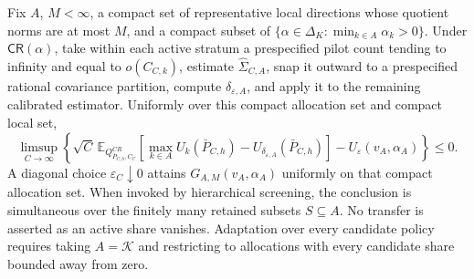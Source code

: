 Fix \(A\), \(M<\infty\), a compact set of representative local directions whose quotient norms are at most \(M\), and a compact subset of \(\{\alpha\in\Delta_K:\min_{k\in A}\alpha_k>0\}\).  Under \(\mathsf{CR}(\alpha)\), take within each active stratum a prespecified pilot count tending to infinity and equal to \(o(C_{C,k})\), estimate \(\widehat\Sigma_{C,A}\), snap it outward to a prespecified rational covariance partition, compute \(\delta_{\varepsilon,A}\), and apply it to the remaining calibrated estimator.  Uniformly over this compact allocation set and compact local set,
\[
\limsup_{C\to\infty}\left\{\sqrt C\,\mathbb E_{Q^{CR}_{\bar P_{C,h},C_C}}
\left[\max_{k\in A}U_k(\bar P_{C,h})-U_{\delta_{\varepsilon,A}}(\bar P_{C,h})\right]
-U_\varepsilon(v_A,\alpha_A)\right\}\leq0.
\]
A diagonal choice \(\varepsilon_C\downarrow0\) attains \(G_{A,M}(v_A,\alpha_A)\) uniformly on that compact allocation set.  When invoked by hierarchical screening, the conclusion is simultaneous over the finitely many retained subsets \(S\subseteq A\).  No transfer is asserted as an active share vanishes.  Adaptation over every candidate policy requires taking \(A=\mathcal K\) and restricting to allocations with every candidate share bounded away from zero.